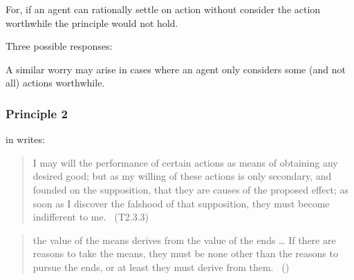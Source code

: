 \documentclass[10pt]{article}
\newcommand{\hozlinedash}[0]{%
  \noindent\hdashrule[0.5ex][c]{\textwidth}{.1pt}{2.5pt}
}
\begin{document}
For, if an agent can rationally settle on action without consider the action worthwhile the principle would not hold.

Three possible responses:


A similar worry may arise in cases where an agent only considers some (and not all) actions worthwhile.





\subsubsection{Principle 2}
\label{sec:principle-2}




\citeauthor{Hume:2011aa} in  writes:

\begin{quote}
  I may will the performance of certain actions as means of obtaining any desired good; but as my willing of these actions is only secondary, and founded on the supposition, that they are causes of the proposed effect; as soon as I discover the falshood of that supposition, they must become indifferent to me.\nolinebreak
  \mbox{ }\hfill\mbox{\hfill(T2.3.3)}
\end{quote}

\hozlinedash

\begin{quote}
    the value of the means derives from the value of the ends \dots
    If there are reasons to take the means, they must be none other than the reasons to pursue the ends, or at least they must derive from them.\nolinebreak
  \mbox{ }\hfill(\cite[2]{Raz:2005aa})
\end{quote}
\end{document}
